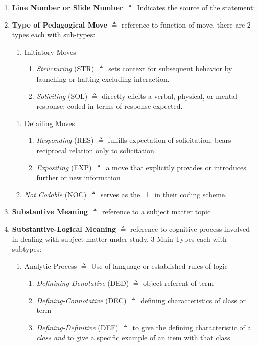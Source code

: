 \documentclass[10pt, letterpaper]{article}
\begin{document}
\begin{enumerate}
\item \textbf{Line Number or Slide Number} \(\triangleq\) Indicates the source of the statement:
\item \textbf{Type of Pedagogical Move} \(\triangleq\) reference to function of move, there are 2 types each with sub-types:
\begin{enumerate}
\item Initiatory Moves
\begin{enumerate}
\item \emph{Structuring} (STR) \(\triangleq\) sets context for subsequent behavior by launching or halting-excluding interaction.
\item \emph{Soliciting} (SOL) \(\triangleq\) directly elicits a verbal, physical, or mental response; coded in terms of response expected.
\end{enumerate}
\end{enumerate}
\begin{enumerate}
\item Detailing Moves
\begin{enumerate}
\item \emph{Responding} (RES) \(\triangleq\) fulfills expectation of solicitation; bears reciprocal relation only to solicitation.
\item \emph{Expositing} (EXP) \(\triangleq\) a move that explicitly provides or introduces further or new information
\end{enumerate}
\item \emph{Not Codable} (NOC) \(\triangleq\) serves as the \(\perp\) in their coding scheme.
\end{enumerate}
\item \textbf{Substantive Meaning} \(\triangleq\) reference to a subject matter topic
\item \textbf{Substantive-Logical Meaning} \(\triangleq\) reference to cognitive process involved in dealing with subject matter under study. 3 Main Types each with subtypes:
\begin{enumerate}
\item Analytic Process \(\triangleq\) Use of language or established rules of logic
\begin{enumerate}
\item \emph{Definining-Denotative} (DED) \(\triangleq\) object referent of term
\item \emph{Defining-Connotative} (DEC) \(\triangleq\) defining characteristics of class or term
\item \emph{Defining-Definitive} (DEF) \(\triangleq\) to give the defining characteristic of a \emph{class and} to give a specific example of an item with that class

\end{enumerate}
\end{enumerate}
\end{enumerate}
\end{document}
